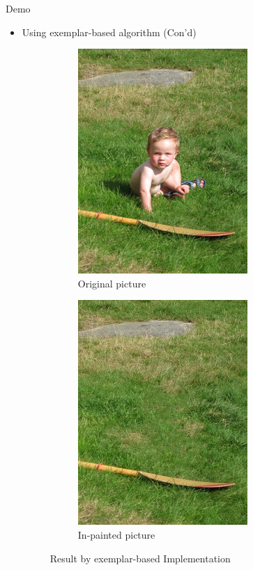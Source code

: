 \documentclass{beamer}
\begin{document}
\begin{frame}{Demo}
	\begin{itemize}
		\item Using exemplar-based algorithm (Con'd)
		\begin{figure}
			\begin{subfigure}[pos]{.5\textwidth}
				\centering
				\includegraphics*[width=0.6\linewidth]{in1.jpg}
				\caption{Original picture}
			\end{subfigure}%
			\begin{subfigure}[pos]{.5\textwidth}
				\centering
				\includegraphics*[width=0.6\linewidth]{out1.jpg}
				\caption{In-painted picture}
			\end{subfigure}%
			\caption{Result by exemplar-based Implementation}
		\end{figure}
	\end{itemize}
\end{frame}
\end{document}
